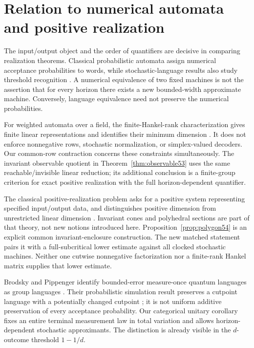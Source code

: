 \section{Relation to numerical automata and positive realization}\label{sec:comparison54}
The input/output object and the order of quantifiers are decisive in comparing realization theorems. Classical probabilistic automata assign numerical acceptance probabilities to words, while stochastic-language results also study threshold recognition \cite{Rabin,Paz}. A numerical equivalence of two fixed machines is not the assertion that for every horizon there exists a new bounded-width approximate machine. Conversely, language equivalence need not preserve the numerical probabilities.

For weighted automata over a field, the finite-Hankel-rank characterization gives finite linear representations and identifies their minimum dimension \cite{BR}. It does not enforce nonnegative rows, stochastic normalization, or simplex-valued decoders. Our common-row contraction concerns these constraints simultaneously. The invariant observable quotient in Theorem~\ref{thm:observable53} uses the same reachable/invisible linear reduction; its additional conclusion is a finite-group criterion for exact positive realization with the full horizon-dependent quantifier.

The classical positive-realization problem asks for a positive system representing specified input/output data, and distinguishes positive dimension from unrestricted linear dimension \cite{BF04}. Invariant cones and polyhedral sections are part of that theory, not new notions introduced here. Proposition~\ref{prop:polygon54} is an explicit common invariant-enclosure construction. The new matched statement pairs it with a full-subcritical lower estimate against all clocked stochastic machines. Neither one cutwise nonnegative factorization nor a finite-rank Hankel matrix supplies that lower estimate.

Brodsky and Pippenger identify bounded-error measure-once quantum languages as group languages \cite[Theorem 3.3]{BP}. Their probabilistic simulation result preserves a cutpoint language with a potentially changed cutpoint \cite[Theorem 3.6]{BP}; it is not uniform additive preservation of every acceptance probability. Our categorical unitary corollary fixes an entire terminal measurement law in total variation and allows horizon-dependent stochastic approximants. The distinction is already visible in the $d$-outcome threshold $1-1/d$.

